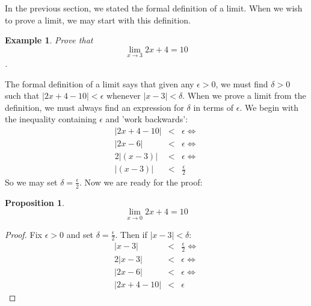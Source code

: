 \documentclass[12pt,a4paper]{article} %
\newtheorem{example}{Example}
\newtheorem{prop}{Proposition}
\begin{document}
In the previous section, we stated the formal definition of a limit.  When we wish to prove a limit, we may start with this definition.
\begin{example}
Prove that $$\lim_{x\rightarrow 3} 2x +4 =10$$.\\
\end{example}
The formal definition of a limit says that given any $\epsilon>0$, we must find $\delta>0$ such that $|2x+4 -10|<\epsilon$ whenever $|x-3|<\delta$.  When we prove a limit from the definition, we must always find an expression for $\delta$ in terms of $\epsilon$.  We begin with the inequality containing $\epsilon$ and 'work backwards':
\begin{eqnarray*}
|2x+4-10| &<& \epsilon \iff \\
|2x-6|&<& \epsilon \iff \\
2|(x-3)|&<&\epsilon \iff\\
|(x-3)|&<&\frac{\epsilon}2
\end{eqnarray*}
So we may set $\delta = \frac{\epsilon}{2}$.  Now we are ready for the proof:
\begin{prop}
$$\lim_{x\rightarrow 0} 2x + 4 =10$$
\end{prop}
\begin{proof}
Fix $\epsilon>0$ and set $\delta = \frac{\epsilon}{2}$.  Then if $|x-3|<\delta$:
\begin{eqnarray*}
|x-3|&<&\frac{\epsilon}{2}\iff\\
2|x-3|&<&\epsilon\iff\\
|2x -6|&<&\epsilon\iff\\
|2x +4 -10|&<&\epsilon
\end{eqnarray*}
\end{proof}
\end{document}
